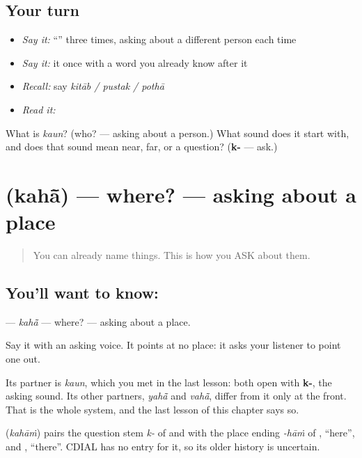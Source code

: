 \subsection*{Your turn}
\begin{itemize}
\raggedright
  \item \emph{Say it:} \textquotedblleft{}\textquotedblright{} three times, asking about a different person each time
  \item \emph{Say it:} it once with a word you already know after it
  \item \emph{Recall:} say \emph{kitāb / pustak / pothā}
  \item \emph{Read it:} \textbf{}
\end{itemize}

\begin{tcolorbox}[breakable,colback=teal!4,colframe=teal!35!black,title={Before you move on}]
What is \emph{kaun}? (who? — asking about a person.) What sound does it start with, and does that sound mean near, far, or a question? (\textbf{k-} — ask.)
\end{tcolorbox}
\section[\texorpdfstring{\hi{कहाँ} (kahā̃)}{कहाँ (kahā̃)}]{ (kahā̃) — where? — asking about a place}

\label{lesson:HI-C40-where}



\begin{quote}
You can already name things. This is how you ASK about them.
\end{quote}

\subsection*{You'll want to know: }
\textbf{} — \emph{kahā̃} — where? — asking about a place.

Say it with an asking voice. It points at no place: it asks your listener to point one out.

Its partner is \textbf{} \emph{kaun}, which you met in the last lesson: both open with \textbf{k-}, the asking sound. Its other partners, \textbf{} \emph{yahā̃} and \textbf{} \emph{vahā̃}, differ from it only at the front. That is the whole system, and the last lesson of this chapter says so.

\begin{cousinweb}
\textbf{} (\emph{kahāṁ}) pairs the question stem \emph{k-} of \textbf{} and \textbf{} with the place ending \emph{-hāṁ} of \textbf{}, \textquotedblleft{}here\textquotedblright{}, and \textbf{}, \textquotedblleft{}there\textquotedblright{}. CDIAL has no entry for it, so its older history is uncertain.
\end{cousinweb}


